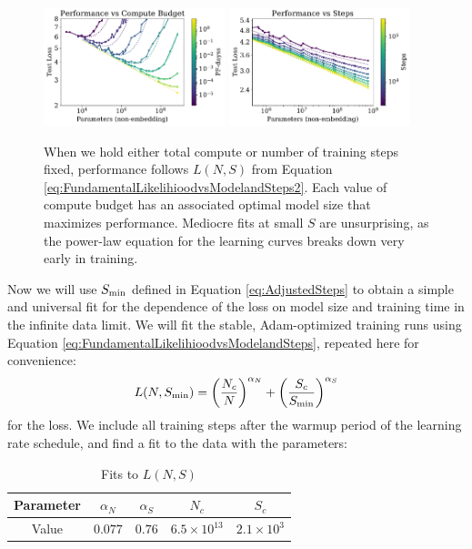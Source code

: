 \documentclass[english]{article}
\newcommand{\be}{\begin{equation}}
\newcommand{\ee}{\end{equation}}
\begin{document}
\begin{figure}
\noindent \centering{}
\includegraphics[width=0.47\textwidth]{PerfVsParams-ComputeBudget}\hfill
\includegraphics[width=0.47\textwidth]{PerfVsParams-StepBudget} 
\caption[Performance versus compute budget or number of parameter updates]{
When we hold either total compute or number of training steps fixed, performance follows $L(N,S)$ from Equation \eqref{eq:FundamentalLikelihioodvsModelandSteps2}.  Each value of compute budget has an associated optimal model size that maximizes performance.  Mediocre fits at small $S$ are unsurprising, as the power-law equation for the learning curves breaks down very early in training. \label{fig:ComputevsParamsvsPerformance}}
\end{figure}

Now we will use $S_{\rm min}$ defined in Equation \eqref{eq:AdjustedSteps} to obtain a  simple and universal fit for the dependence of the loss on model size and training time in the infinite data limit.  We will fit the stable, Adam-optimized training runs using Equation \eqref{eq:FundamentalLikelihioodvsModelandSteps}, repeated here for convenience:
\be
\label{eq:FundamentalLikelihioodvsModelandSteps2}
L(N, S_{\rm min}) = \left( \frac{N_c}{N} \right)^{\alpha_N}  + \left( \frac{S_c }{S_{\rm min}} \right)^{\alpha_S}
\ee
for the loss.  We include all training steps after the warmup period of the learning rate schedule, and find  a fit to the data with the parameters:

\begin{table}[h!]
\centering
\begin{tabular}{|c| c | c | c | c| } 
 \hline
Parameter & $\alpha_N$ & $\alpha_S$ & $N_c$ & $S_c$   \\ [0.5ex] 
 \hline\hline
Value  & $0.077$ & $0.76$ & $6.5 \times 10^{13}$ & $2.1 \times 10^3$  \\ 
 \hline
\end{tabular}
\vspace{0.5em}
\caption{Fits to $L(N, S)$}
\vspace{-1em}
\end{table}
\end{document}
